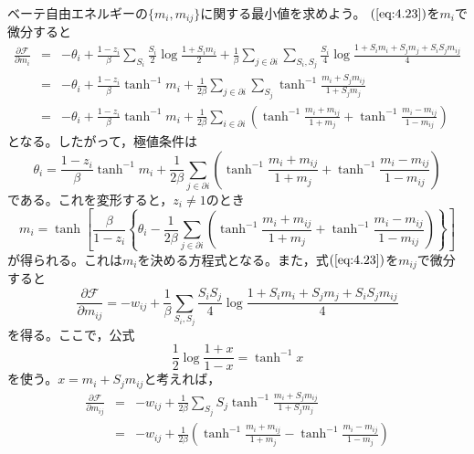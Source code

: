 ベーテ自由エネルギーの$\{m_{i},m_{ij}\}$に関する最小値を求めよう。
$(\ref{eq:4.23})$を$m_{i}$で微分すると
\begin{eqnarray}
\frac{\partial\mathcal{F}}{\partial m_{i}}&=&-\theta_{i}+
\frac{1-z_{i}}{\beta}\sum_{S_{i}}\frac{S_{i}}{2}\log\frac{1+S_{i}m_{i}}{2}
+\frac{1}{\beta}\sum_{j\in\partial i}\sum_{S_{i},S_{j}}\frac{S_{i}}{4}
\log\frac{1+S_{i}m_{i}+S_{j}m_{j}+S_{i}S_{j}m_{ij}}{4}\nonumber\\
&=&-\theta_{i}+\frac{1-z_{i}}{\beta}\tanh^{-1}m_{i}+\frac{1}{2\beta}
\sum_{j\in\partial
i}\sum_{S_{j}}\tanh^{-1}\frac{m_{i}+S_{j}m_{ij}}{1+S_{j}m_{j}}\nonumber\\
&=&-\theta_{i}+\frac{1-z_{i}}{\beta}\tanh^{-1}m_{i}
+\frac{1}{2\beta}\sum_{i\in\partial i}\left(
\tanh^{-1}\frac{m_{i}+m_{ij}}{1+m_{j}}+\tanh^{-1}\frac{m_{i}-m_{ij}}{1-m_{ij}}
\right)\label{eq:4.24}
\end{eqnarray}
となる。したがって，極値条件は
\begin{equation}
\theta_{i}=\frac{1-z_{i}}{\beta}\tanh^{-1}m_{i}+\frac{1}{2\beta}
\sum_{j\in\partial i}\left(
\tanh^{-1}\frac{m_{i}+m_{ij}}{1+m_{j}}+\tanh^{-1}\frac{m_{i}-m_{ij}}{1-m_{ij}}
\right)\label{eq:4.25}
\end{equation}
である。これを変形すると，$z_{i}\neq 1$のとき
\begin{equation}
m_{i}=\tanh\left[\frac{\beta}{1-z_{i}}\left\{\theta_{i}-
\frac{1}{2\beta}\sum_{j\in\partial i}
\left(
\tanh^{-1}\frac{m_{i}+m_{ij}}{1+m_{j}}+\tanh^{-1}\frac{m_{i}-m_{ij}}{1-m_{ij}}
\right)\right\}\right]
\end{equation}
が得られる。これは$m_{i}$を決める方程式となる。また，式$(\ref{eq:4.23})$を$m_{ij}$で微分
すると
\begin{equation}
\frac{\partial\mathcal{F}}{\partial m_{ij}}=
-w_{ij}+\frac{1}{\beta}\sum_{S_{i},S_{j}}\frac{S_{i}S_{j}}{4}
\log\frac{1+S_{i}m_{i}+S_{j}m_{j}+S_{i}S_{j}m_{ij}}{4}\nonumber
\end{equation}
を得る。ここで，公式
\begin{equation}
\frac{1}{2}\log\frac{1+x}{1-x}=\tanh^{-1}x\label{eq:atanh}
\end{equation}
を使う。$x=m_{i}+S_{j}m_{ij}$と考えれば，
\begin{eqnarray}
\frac{\partial\mathcal{F}}{\partial m_{ij}}&=&-w_{ij}+\frac{1}{2\beta}
\sum_{S_{j}}S_{j}\tanh^{-1}\frac{m_{i}+S_{j}m_{ij}}{1+S_{j}m_{j}}\nonumber\\
&=&-w_{ij}+\frac{1}{2\beta}\left(
\tanh^{-1}\frac{m_{i}+m_{ij}}{1+m_{j}}-\tanh^{-1}\frac{m_{i}-m_{ij}}{1-m_{j}}
\right)\label{eq:4.27}
\end{eqnarray}
